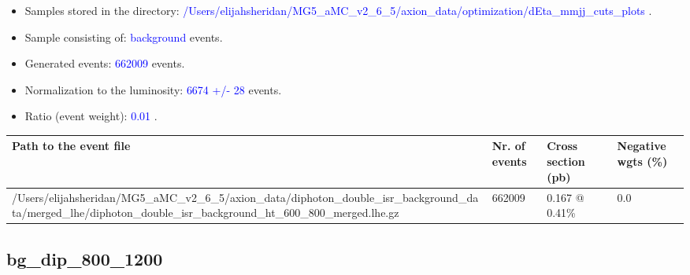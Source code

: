 \documentclass[a4paper, 10pt]{article}
\begin{document}
\begin{itemize}
  \item Samples stored in the directory: \textcolor{blue}{/\-Users/\-elijahsheridan/\-MG5\_aMC\_v2\_6\_5/\-axion\_data/\-optimization/\-dEta\_mmjj\_cuts\_plots} .
   \item Sample consisting of: \textcolor{blue}{background}  events.
   \item Generated events: \textcolor{blue}{662009 }  events.
   \item Normalization to the luminosity: \textcolor{blue}{6674}\textcolor{blue}{ +/\-- }\textcolor{blue}{28 }  events.
   \item Ratio (event weight): \textcolor{blue}{0.01 } .  
 
\end{itemize}
\begin{table}[H]
  \begin{center}
    \begin{tabular}{|m{55.0mm}|m{25.0mm}|m{30.0mm}|m{30.0mm}|}
      \hline
      {\cellcolor{yellow}         Path to the event file}& {\cellcolor{yellow}         Nr. of events}& {\cellcolor{yellow}         Cross section (pb)}& {\cellcolor{yellow}         Negative wgts (\%)}\\
      \hline
      {\cellcolor{white}          /\-Users/\-elijahsheridan/\-MG5\_aMC\_v2\_6\_5/\-axion\_data/\-diphoton\_double\_isr\_background\_data/\-merged\_lhe/\-diphoton\_double\_isr\_background\_ht\_600\_800\_merged.lhe.gz}& {\cellcolor{white}          662009}& {\cellcolor{white}          0.167 @ 0.41\%}& {\cellcolor{white}          0.0}\\
\hline
    \end{tabular}
  \end{center}
\end{table}

\subsection{ bg\_dip\_800\_1200}
\end{document}
